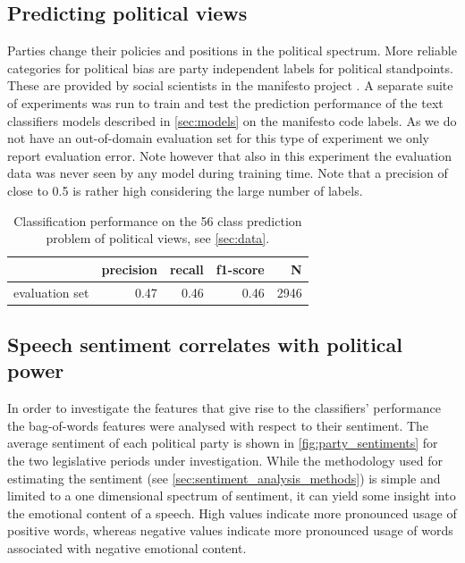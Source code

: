 \documentclass[runningheads,a4paper]{llncs}
\begin{document}
\subsection{Predicting political views}
Parties change their policies and positions in the political spectrum. More reliable categories for political bias are party independent labels for political standpoints. These are provided by social scientists in the manifesto project \cite{manifesto}. A separate suite of experiments was run to train and test the prediction performance of the text classifiers models described in \autoref{sec:models} on the manifesto code labels. As we do not have an out-of-domain evaluation set for this type of experiment we only report evaluation error. Note however that also in this experiment the evaluation data was never seen by any model during training time.
Note that a precision of close to 0.5 is rather high considering the large number of labels. 

\begin{table}[t]
\begin{center}
\begin{tabular}{lrrrr}
    &         precision    &recall &  f1-score  & N\\
\hline\hline
evaluation set    &  0.47    &  0.46 &     0.46 &     2946\\
%
\end{tabular}
\end{center}
\caption{
\label{tab:results_avg_political_view}
Classification performance on the 56 class prediction problem of political views, see \autoref{sec:data}.
}
\end{table}

\subsection{Speech sentiment correlates with political power}\label{sec:sentiment_result}
In order to investigate the features that give rise to the classifiers' performance the bag-of-words features were analysed with respect to their sentiment. The average sentiment of each political party is shown in \autoref{fig:party_sentiments} for the two legislative periods under investigation. While the methodology used for estimating the sentiment (see \autoref{sec:sentiment_analysis_methods}) is simple and limited to a one dimensional spectrum of sentiment, it can yield some insight into the emotional content of a speech. High values indicate more pronounced usage of positive words, whereas negative values indicate more pronounced usage of words associated with negative emotional content. 
\end{document}
